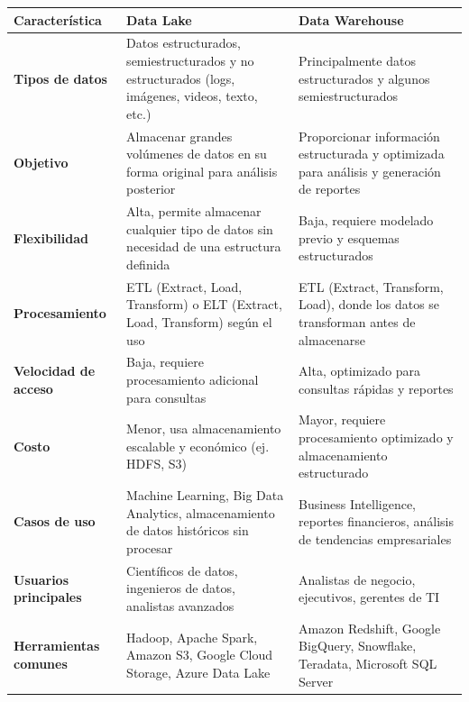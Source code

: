 \documentclass[12pt]{article}
\begin{document}
\begin{table}[h]
    \centering
    \begin{tabular}{|p{3.5cm}|p{6cm}|p{5.8cm}|}
        \hline
        \textbf{Característica} & \textbf{Data Lake} & \textbf{Data Warehouse} \\
        \hline
        \textbf{Tipos de datos} & Datos estructurados, semiestructurados y no estructurados (logs, imágenes, videos, texto, etc.) & Principalmente datos estructurados y algunos semiestructurados \\
        \hline
        \textbf{Objetivo} & Almacenar grandes volúmenes de datos en su forma original para análisis posterior & Proporcionar información estructurada y optimizada para análisis y generación de reportes \\
        \hline
        \textbf{Flexibilidad} & Alta, permite almacenar cualquier tipo de datos sin necesidad de una estructura definida & Baja, requiere modelado previo y esquemas estructurados \\
        \hline
        \textbf{Procesamiento} & ETL (Extract, Load, Transform) o ELT (Extract, Load, Transform) según el uso & ETL (Extract, Transform, Load), donde los datos se transforman antes de almacenarse \\
        \hline
        \textbf{Velocidad de acceso} & Baja, requiere procesamiento adicional para consultas & Alta, optimizado para consultas rápidas y reportes \\
        \hline
        \textbf{Costo} & Menor, usa almacenamiento escalable y económico (ej. HDFS, S3) & Mayor, requiere procesamiento optimizado y almacenamiento estructurado \\
        \hline
        \textbf{Casos de uso} & Machine Learning, Big Data Analytics, almacenamiento de datos históricos sin procesar & Business Intelligence, reportes financieros, análisis de tendencias empresariales \\
        \hline
        \textbf{Usuarios principales} & Científicos de datos, ingenieros de datos, analistas avanzados & Analistas de negocio, ejecutivos, gerentes de TI \\
        \hline
        \textbf{Herramientas comunes} & Hadoop, Apache Spark, Amazon S3, Google Cloud Storage, Azure Data Lake & Amazon Redshift, Google BigQuery, Snowflake, Teradata, Microsoft SQL Server \\
        \hline
    \end{tabular}
    \label{tab:data_lake_vs_warehouse}
\end{table}
\end{document}
